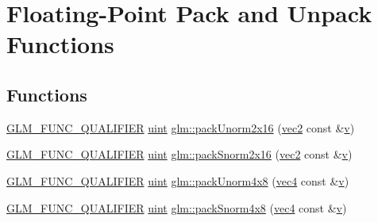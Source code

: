 \hypertarget{group__core__func__packing}{}\section{Floating-\/\+Point Pack and Unpack Functions}
\label{group__core__func__packing}
\subsection*{Functions}
\begin{DoxyCompactItemize}
\item 
\hyperlink{setup_8hpp_a33fdea6f91c5f834105f7415e2a64407}{G\+L\+M\+\_\+\+F\+U\+N\+C\+\_\+\+Q\+U\+A\+L\+I\+F\+I\+ER} \hyperlink{group__core__precision_ga4fd29415871152bfb5abd588334147c8}{uint} \hyperlink{group__core__func__packing_ga0e2d107039fe608a209497af867b85fb}{glm\+::pack\+Unorm2x16} (\hyperlink{group__core__types_gaa1618f51db67eaa145db101d8c8431d8}{vec2} const \&\hyperlink{_s_d_l__opengl_8h_a10a82eabcb59d2fcd74acee063775f90}{v})
\item 
\hyperlink{setup_8hpp_a33fdea6f91c5f834105f7415e2a64407}{G\+L\+M\+\_\+\+F\+U\+N\+C\+\_\+\+Q\+U\+A\+L\+I\+F\+I\+ER} \hyperlink{group__core__precision_ga4fd29415871152bfb5abd588334147c8}{uint} \hyperlink{group__core__func__packing_ga977ab172da5494e5ac63e952afacfbe2}{glm\+::pack\+Snorm2x16} (\hyperlink{group__core__types_gaa1618f51db67eaa145db101d8c8431d8}{vec2} const \&\hyperlink{_s_d_l__opengl_8h_a10a82eabcb59d2fcd74acee063775f90}{v})
\item 
\hyperlink{setup_8hpp_a33fdea6f91c5f834105f7415e2a64407}{G\+L\+M\+\_\+\+F\+U\+N\+C\+\_\+\+Q\+U\+A\+L\+I\+F\+I\+ER} \hyperlink{group__core__precision_ga4fd29415871152bfb5abd588334147c8}{uint} \hyperlink{group__core__func__packing_gaf7d2f7341a9eeb4a436929d6f9ad08f2}{glm\+::pack\+Unorm4x8} (\hyperlink{group__core__types_ga5881b1b022d7fd1b7218f5916532dd02}{vec4} const \&\hyperlink{_s_d_l__opengl_8h_a10a82eabcb59d2fcd74acee063775f90}{v})
\item 
\hyperlink{setup_8hpp_a33fdea6f91c5f834105f7415e2a64407}{G\+L\+M\+\_\+\+F\+U\+N\+C\+\_\+\+Q\+U\+A\+L\+I\+F\+I\+ER} \hyperlink{group__core__precision_ga4fd29415871152bfb5abd588334147c8}{uint} \hyperlink{group__core__func__packing_ga85e8f17627516445026ab7a9c2e3531a}{glm\+::pack\+Snorm4x8} (\hyperlink{group__core__types_ga5881b1b022d7fd1b7218f5916532dd02}{vec4} const \&\hyperlink{_s_d_l__opengl_8h_a10a82eabcb59d2fcd74acee063775f90}{v})
\item 

\end{DoxyCompactItemize}
